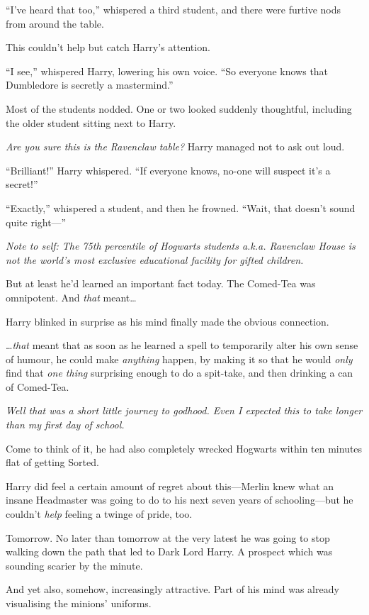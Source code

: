“I’ve heard that too,” whispered a third student, and there were furtive nods from around the table.

This couldn’t help but catch Harry’s attention.

“I see,” whispered Harry, lowering his own voice. “So everyone knows that Dumbledore is secretly a mastermind.”

Most of the students nodded. One or two looked suddenly thoughtful, including the older student sitting next to Harry.

\emph{Are you sure this is the Ravenclaw table?} Harry managed not to ask out loud.

“Brilliant!” Harry whispered. “If everyone knows, no-one will suspect it’s a secret!”

“Exactly,” whispered a student, and then he frowned. “Wait, that doesn’t sound quite right—”

\emph{Note to self: The 75th percentile of Hogwarts students a.k.a. Ravenclaw House is not the world’s most exclusive educational facility for gifted children.}

But at least he’d learned an important fact today. The Comed-Tea was omnipotent. And \emph{that} meant…

Harry blinked in surprise as his mind finally made the obvious connection.

…\emph{that} meant that as soon as he learned a spell to temporarily alter his own sense of humour, he could make \emph{anything} happen, by making it so that he would \emph{only} find that \emph{one thing} surprising enough to do a spit-take, and then drinking a can of Comed-Tea.

\emph{Well that was a short little journey to godhood. Even I expected this to take longer than my first day of school.}

Come to think of it, he had also completely wrecked Hogwarts within ten minutes flat of getting Sorted.

Harry did feel a certain amount of regret about this—Merlin knew what an insane Headmaster was going to do to his next seven years of schooling—but he couldn’t \emph{help} feeling a twinge of pride, too.

Tomorrow. No later than tomorrow at the very latest he was going to stop walking down the path that led to Dark Lord Harry. A prospect which was sounding scarier by the minute.

And yet also, somehow, increasingly attractive. Part of his mind was already visualising the minions’ uniforms.

